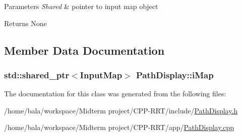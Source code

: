 \begin{DoxyParams}{Parameters}
{\em Shared} & pointer to input map object \\
\hline
\end{DoxyParams}
\begin{DoxyReturn}{Returns}
None 
\end{DoxyReturn}


\subsection{Member Data Documentation}
\subsubsection[{\texorpdfstring{i\+Map}{iMap}}]{\setlength{\rightskip}{0pt plus 5cm}std\+::shared\+\_\+ptr$<${\bf Input\+Map}$>$ Path\+Display\+::i\+Map}\hypertarget{classPathDisplay_af35e969a46cc0a7c5ec013efde7ae51e}{}\label{classPathDisplay_af35e969a46cc0a7c5ec013efde7ae51e}


The documentation for this class was generated from the following files\+:\begin{DoxyCompactItemize}
\item 
/home/bala/workspace/\+Midterm project/\+C\+P\+P-\/\+R\+R\+T/include/\hyperlink{PathDisplay_8h}{Path\+Display.\+h}\item 
/home/bala/workspace/\+Midterm project/\+C\+P\+P-\/\+R\+R\+T/app/\hyperlink{PathDisplay_8cpp}{Path\+Display.\+cpp}\end{DoxyCompactItemize}
